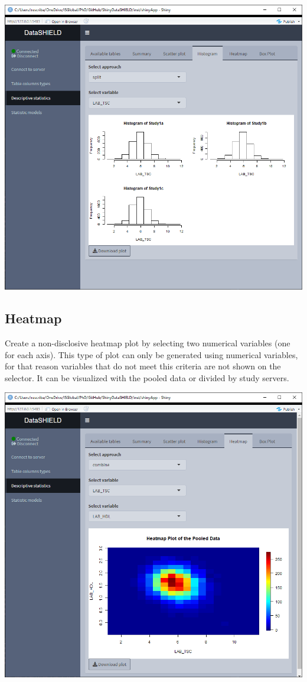 \documentclass[
]{book}
\begin{document}
\includegraphics{images/descriptive_stats4_2.png}

\hypertarget{heatmap}{%
\subsection{Heatmap}\label{heatmap}}

Create a non-disclosive heatmap plot by selecting two numerical variables (one for each axis). This type of plot can only be generated using numerical variables, for that reason variables that do not meet this criteria are not shown on the selector. It can be visualized with the pooled data or divided by study servers.

\includegraphics{images/descriptive_stats5.png}
\end{document}
